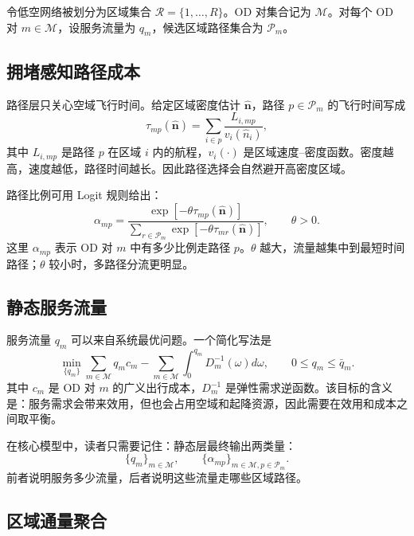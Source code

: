 \documentclass[a4paper,12pt]{article}
\theoremstyle{plain}
\theoremstyle{definition}
\theoremstyle{remark}
\begin{document}
令低空网络被划分为区域集合 $\mathcal R=\{1,\ldots,R\}$。OD 对集合记为 $\mathcal M$。对每个 OD 对 $m\in\mathcal M$，设服务流量为 $q_m$，候选区域路径集合为 $\mathcal P_m$。

\subsection{拥堵感知路径成本}

路径层只关心空域飞行时间。给定区域密度估计 $\hat{\bm n}$，路径 $p\in\mathcal P_m$ 的飞行时间写成
\begin{equation}\label{eq:core_path_time}
    \tau_{mp}(\hat{\bm n})
    =
    \sum_{i\in p}\frac{L_{i,mp}}{v_i(\hat n_i)} ,
\end{equation}
其中 $L_{i,mp}$ 是路径 $p$ 在区域 $i$ 内的航程，$v_i(\cdot)$ 是区域速度--密度函数。密度越高，速度越低，路径时间越长。因此路径选择会自然避开高密度区域。

路径比例可用 Logit 规则给出：
\begin{equation}\label{eq:core_logit}
    \alpha_{mp}
    =
    \frac{\exp[-\theta \tau_{mp}(\hat{\bm n})]}
    {\sum_{r\in\mathcal P_m}\exp[-\theta \tau_{mr}(\hat{\bm n})]},
    \qquad \theta>0 .
\end{equation}
这里 $\alpha_{mp}$ 表示 OD 对 $m$ 中有多少比例走路径 $p$。$\theta$ 越大，流量越集中到最短时间路径；$\theta$ 较小时，多路径分流更明显。

\subsection{静态服务流量}

服务流量 $q_m$ 可以来自系统最优问题。一个简化写法是
\begin{equation}\label{eq:core_so}
    \min_{\{q_m\}}
    \sum_{m\in\mathcal M} q_m c_m
    -
    \sum_{m\in\mathcal M}\int_0^{q_m}D_m^{-1}(\omega)d\omega ,
    \qquad
    0\le q_m\le \bar q_m .
\end{equation}
其中 $c_m$ 是 OD 对 $m$ 的广义出行成本，$D_m^{-1}$ 是弹性需求逆函数。该目标的含义是：服务需求会带来效用，但也会占用空域和起降资源，因此需要在效用和成本之间取平衡。

在核心模型中，读者只需要记住：静态层最终输出两类量：
\[
    \{q_m\}_{m\in\mathcal M},
    \qquad
    \{\alpha_{mp}\}_{m\in\mathcal M,p\in\mathcal P_m}.
\]
前者说明服务多少流量，后者说明这些流量走哪些区域路径。

\subsection{区域通量聚合}
\end{document}
